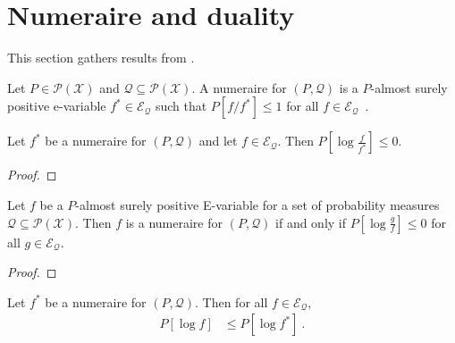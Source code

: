 


\section{Numeraire and duality}

This section gathers results from \cite{larsson2024numeraire}.

\begin{definition}\label{def:IsNumeraire}
  \leanok
Let $P \in \mathcal{P}(\mathcal{X})$ and $\mathcal{Q} \subseteq \mathcal{P}(\mathcal{X})$.
A numeraire for $(P, \mathcal{Q})$ is a $P$-almost surely positive e-variable $f^* \in \mathcal{E}_{\mathcal{Q}}$ such that $P[f / f^*] \le 1$ for all $f \in \mathcal{E}_{\mathcal{Q}}$~.
\end{definition}


\begin{lemma}\label{lem:IsNumeraire.eintegral_log_div_nonpos}
  \leanok
Let $f^*$ be a numeraire for $(P, \mathcal{Q})$ and let $f \in \mathcal{E}_{\mathcal{Q}}$.
Then $P\left[\log \frac{f}{f^*}\right] \le 0$.
\end{lemma}

\begin{proof}\leanok

\end{proof}


\begin{lemma}\label{lem:numeraire_iff_logOptimal}
Let $f$ be a $P$-almost surely positive E-variable for a set of probability measures $\mathcal{Q} \subseteq \mathcal{P}(\mathcal{X})$.
Then $f$ is a numeraire for $(P, \mathcal{Q})$ if and only if $P[\log \frac{g}{f}] \le 0$ for all $g \in \mathcal{E}_{\mathcal{Q}}$.
\end{lemma}

\begin{proof}

\end{proof}


\begin{lemma}\label{lem:IsNumeraire.eintegral_log_le}
  \leanok
Let $f^*$ be a numeraire for $(P, \mathcal{Q})$.
Then for all $f \in \mathcal{E}_{\mathcal{Q}}$,
\begin{align*}
  P[\log f]
  &\le P[\log f^*]
  \: .
\end{align*}
\end{lemma}

